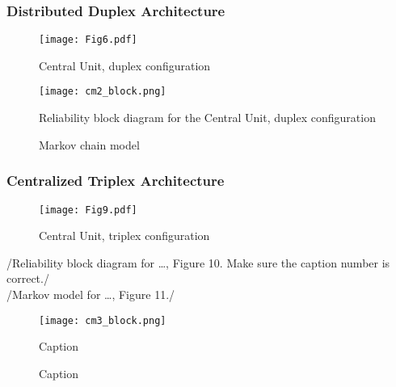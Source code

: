 \subsubsection{Distributed Duplex Architecture}
\begin{figure}[H]
  \centering
  \texttt{[image: Fig6.pdf]}
  \caption{Central Unit, duplex configuration }
  \label{fig6}
\end{figure}
\begin{figure}[H]
  \centering
  \texttt{[image: cm2\_block.png]}
  \caption{Reliability block diagram for the Central Unit, duplex configuration}
  \label{fig7}
\end{figure}
\begin{figure}[h!]
\begin{center}
\caption{Markov chain model}
\end{center}
\end{figure}
\subsubsection{Centralized Triplex Architecture}

\begin{figure}[H]
  \centering
  \texttt{[image: Fig9.pdf]}
  \caption{Central Unit, triplex configuration }
  \label{fig9}
\end{figure}
/{Reliability block diagram for …, Figure 10.  Make sure the caption number is correct.}/
\\/{Markov model for …, Figure 11.}/

\begin{figure}[H]
  \centering
  \texttt{[image: cm3\_block.png]}
  \caption{Caption }
  \label{fig10}
\end{figure}
\begin{figure}[H]
  \centering
  \caption{Caption}
  \label{fig11}
\end{figure}
